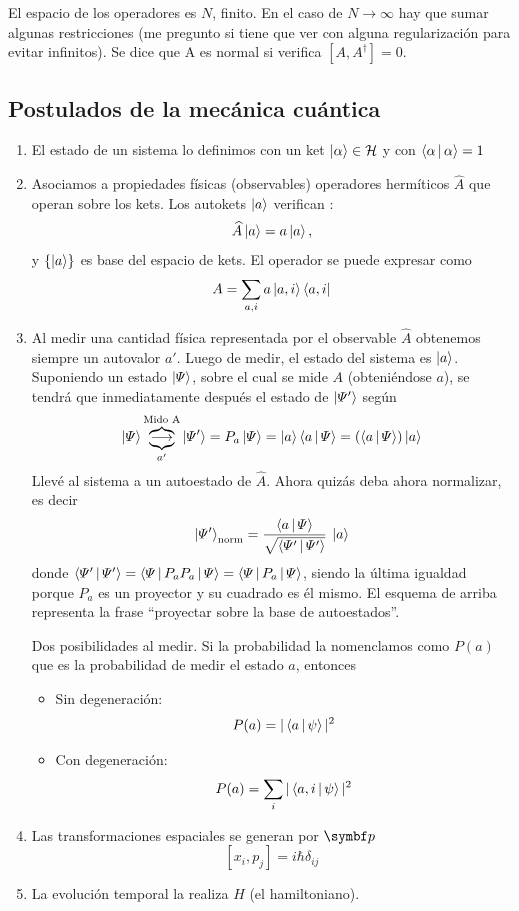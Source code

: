 \documentclass[10pt,oneside]{CBFT_book}
\begin{document}
El espacio de los operadores es $N$, finito. En el caso de $N \to \infty$ hay que sumar algunas
restricciones (me pregunto si tiene que ver con alguna regularización para evitar infinitos).
Se dice que A es normal si verifica $[A,A^\dagger] = 0$.

\subsection{Postulados de la mecánica cuántica}

\begin{enumerate}
	\item El estado de un sistema lo definimos con un ket $\Ket{\alpha} \in \mathcal{H}$ y
		con $\Braket{\alpha|\alpha}=1$
	\item Asociamos a propiedades físicas (observables) operadores hermíticos $\widehat{A}$ 
		que operan sobre los kets. Los autokets $\Ket{a}$ verifican :
	\[
		\widehat{A}\Ket{a} = a \Ket{a}, 
	\]
	y $\{ \Ket{a} \}$ es base del espacio de kets. El operador se puede expresar como
	\[
		A = \sum_{a,i} a \Ket{a,i}\Bra{a,i}
	\]
	\item Al medir una cantidad física representada por el observable $\widehat{A}$ obtenemos
	siempre un autovalor $a'$.
	Luego de medir, el estado del sistema es $\Ket{a}$.
	Suponiendo un estado $\Ket{\Psi}$, sobre el cual se mide $A$ (obteniéndose $a$), se tendrá que
	inmediatamente después el estado de $\Ket{\Psi'}$ según
	\[
		\Ket{\Psi} \overbrace{\underbrace{\longrightarrow}_{a'}}^{\text{Mido A}} \Ket{\Psi'} =
		P_a \Ket{\Psi} = \Ket{a}\Braket{a|\Psi} =(\Braket{a|\Psi})\Ket{a}
	\]
	Llevé al sistema a un autoestado de $\widehat{A}$. 
	Ahora quizás deba ahora normalizar, es decir
	\[
		\Ket{\Psi'}_\text{norm} = \frac{\Braket{a|\Psi}}{\sqrt{\Braket{\Psi'|\Psi'}}} \: \Ket{a}
	\]
	donde $\Braket{\Psi'|\Psi'}=\Braket{\Psi|P_a P_a|\Psi} = \Braket{\Psi|P_a|\Psi}$, siendo la
	última igualdad porque $P_a$ es un proyector y su cuadrado es él mismo.
	El esquema de arriba representa la frase ``proyectar sobre la base de autoestados''.
	
	Dos posibilidades al medir. Si la probabilidad la nomenclamos como $P(a)$ que es la probabilidad
	de medir el estado $a$, entonces
	\begin{itemize}
	 \item Sin degeneración:
	 \[
		P(a) = |\Braket{a|\psi}|^2
	 \]
	 \item Con degeneración:
	 \[
		P(a) = \sum_{i} |\Braket{a,i|\psi}|^2
	 \]
	\end{itemize}
	\item Las transformaciones espaciales se generan por $\vb{p}$
	\[	
		[x_i,p_j] = i\hbar\delta_{ij}
	\]
	\item La evolución temporal la realiza $H$ (el hamiltoniano).
\end{enumerate}
\end{document}
